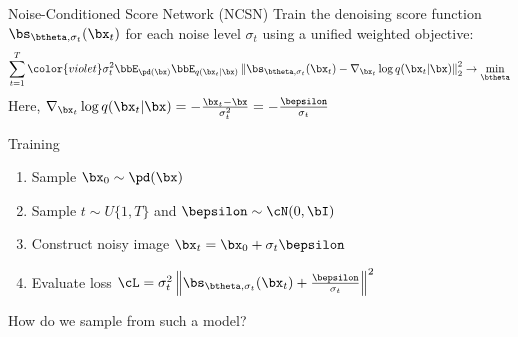 \documentclass{beamer}
\begin{document}
\begin{frame}{Noise-Conditioned Score Network (NCSN)}
	Train the denoising score function $\bs_{\btheta, \sigma_t}(\bx_t)$ for each noise level $\sigma_t$ using a unified weighted objective:
	\vspace{-0.2cm}
	\[
		\sum_{t=1}^T {\color{violet}\sigma_t^2} \bbE_{\pd(\bx)} \bbE_{q(\bx_t | \bx)}\left\| \bs_{\btheta, \sigma_t}(\bx_t) - \nabla_{\bx_t} \log q(\bx_t | \bx) \right\|_2^2 \rightarrow \min_{\btheta}
	\]
    \eqpause
	Here, $\nabla_{\bx_t} \log q(\bx_t | \bx) = - \frac{\bx_t - \bx}{\sigma_t^2} = - \frac{\bepsilon}{\sigma_t}$
    \eqpause
	\begin{block}{Training}
		\begin{enumerate}
			\item Sample $\bx_0 \sim \pd(\bx)$
			\item Sample $t \sim U\{1, T\}$ and $\bepsilon \sim \cN(0, \bI)$
			\item Construct noisy image $\bx_t = \bx_0 + \sigma_t \bepsilon$
			\item Evaluate loss $ \cL = \sigma_t^2 \left\| \bs_{\btheta, \sigma_t}(\bx_t) + \frac{\bepsilon}{\sigma_t} \right\|^2 $
		\end{enumerate}
		\vspace{-0.3cm}
	\end{block}
    \eqpause
	How do we sample from such a model?
\end{frame}
\end{document}
